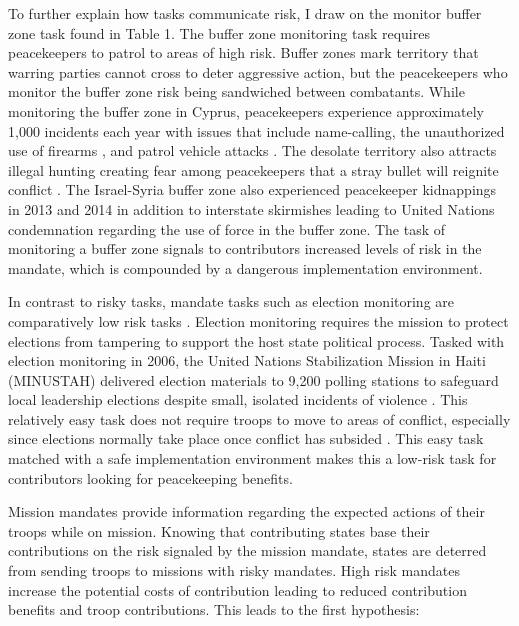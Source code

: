 \documentclass[12pt]{article}
\begin{document}

To further explain how tasks communicate risk, I draw on the monitor buffer zone task found in Table 1. The buffer zone monitoring task requires peacekeepers to patrol to areas of high risk. Buffer zones mark territory that warring parties cannot cross to deter aggressive action, but the peacekeepers who monitor the buffer zone risk being sandwiched between combatants. While monitoring the buffer zone in Cyprus, peacekeepers experience approximately 1,000 incidents each year with issues that include name-calling, the unauthorized use of firearms \citep{Aboutthe17:online}, and patrol vehicle attacks \citep{UN_CYP_2022}. The desolate territory also attracts illegal hunting creating fear among peacekeepers that a stray bullet will reignite conflict \citep{UNFICYPw80:online}. The Israel-Syria buffer zone also experienced peacekeeper kidnappings in 2013 and 2014 \citep{PKO_UNDOF} in addition to interstate skirmishes leading to United Nations condemnation regarding the use of force in the buffer zone. The task of monitoring a buffer zone signals to contributors increased levels of risk in the mandate, which is compounded by a dangerous implementation environment.

In contrast to risky tasks, mandate tasks such as election monitoring are comparatively low risk tasks \citep{Election}. Election monitoring requires the mission to protect elections from tampering to support the host state political process. Tasked with election monitoring in 2006, the United Nations Stabilization Mission in Haiti (MINUSTAH) delivered election materials to 9,200 polling stations to safeguard local leadership elections despite small, isolated incidents of violence \citep{UN_election}. This relatively easy task does not require troops to move to areas of conflict, especially since elections normally take place once conflict has subsided \citep{fjelde2021protecting}. This easy task matched with a safe implementation environment makes this a low-risk task for contributors looking for peacekeeping benefits.  

Mission mandates provide information regarding the expected actions of their troops while on mission. Knowing that contributing states base their contributions on the risk signaled by the mission mandate, states are deterred from sending troops to missions with risky mandates. High risk mandates increase the potential costs of contribution leading to reduced contribution benefits and troop contributions. This leads to the first hypothesis: 
\end{document}
